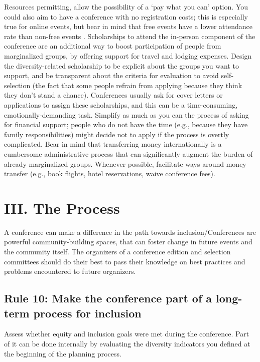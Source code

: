 \documentclass[10pt,letterpaper]{article}
\begin{document}
Resources permitting, allow the possibility of a `pay what you can' option. You could also aim to have a conference with no registration costs; this is especially true for online events, but bear in mind that free events have a lower attendance rate than non-free events \cite{eventbrite_ultimate_2017}. 
Scholarships to attend the in-person component of the conference are an additional way to boost participation of people from marginalized groups, by offering support for travel and lodging expenses.
Design the diversity-related scholarship to be explicit about the groups you want to support, and be transparent about the criteria for evaluation to avoid self-selection (the fact that some people refrain from applying because they think they don't stand a chance). 
Conferences usually ask for cover letters or applications to assign these scholarships, and this can be a time-consuming, emotionally-demanding task. 
Simplify as much as you can the process of asking for financial support; 
people who do not have the time (e.g., because they have family responsibilities) might decide not to apply if the process is overtly complicated. 
Bear in mind that transferring money internationally is a cumbersome administrative process that can significantly augment the burden of already marginalized groups. Whenever possible, facilitate ways around money transfer (e.g., book flights, hotel reservations, waive conference fees).



\section*{III. The Process}

A conference can make a difference in the path towards inclusion/Conferences are powerful community-building spaces, that can foster change in future events and the community itself. The organizers of a conference edition and selection committees should do their best to pass their knowledge on best practices and problems encountered to future organizers.


\subsection*{Rule 10: Make the conference part of a long-term process for inclusion}
\label{rule_process}

Assess whether equity and inclusion goals were met during the conference. 
Part of it can be done internally by evaluating the diversity indicators you defined at the beginning of the planning process. %
 
\end{document}

